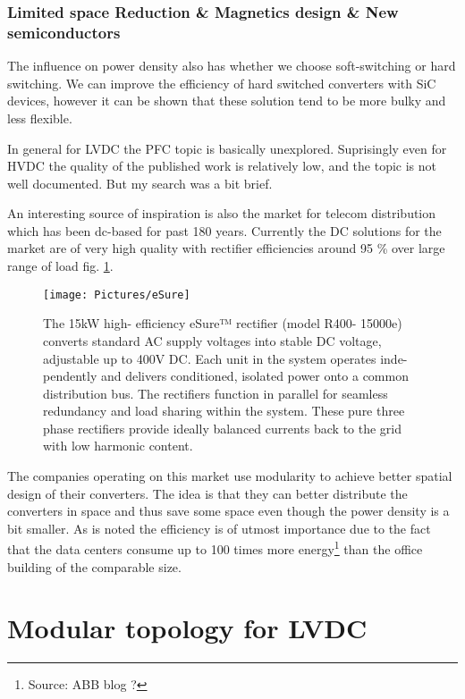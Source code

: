 \documentclass[]{scrartcl}
\begin{document}
\subsubsection{Limited space Reduction \& Magnetics design \& New semiconductors}

The influence on power density also has whether we choose soft-switching or hard switching. We can improve the efficiency of hard switched converters with SiC devices, however it can be shown that these solution tend to be more bulky and less flexible. 

In general for LVDC the PFC topic is basically unexplored. Suprisingly even for HVDC the quality of the published work is relatively low, and the topic is not well documented. But my search was a bit brief.  

An interesting source of inspiration is also the market for telecom distribution which has been dc-based for past 180 years. Currently the DC solutions for the market are of very high quality with rectifier efficiencies around 95 \% over large range of load fig. \ref{fig:eSure}.
\begin{figure}[h!]
	\centering
	\texttt{[image: Pictures/eSure]}
	\caption{The 15kW high- efficiency eSure™ rectifier (model R400- 15000e) converts standard AC supply voltages into stable DC voltage, adjustable up to 400V DC. Each unit in the system operates inde- pendently and delivers conditioned, isolated power onto a common distribution bus. The rectifiers function in parallel for seamless redundancy and load sharing within the system. These pure three phase rectifiers provide ideally balanced currents back to the grid with low harmonic content.}
	\label{fig:eSure}
\end{figure}
The companies operating on this market use modularity to achieve better spatial design of their converters. The idea is that they can better distribute the converters in space and thus save some space even though the power density is a bit smaller. As is noted the efficiency is of utmost importance due to the fact that the data centers consume up to 100 times more energy\footnote{Source: ABB blog ?} than the office building of the comparable size. 

\newpage
\section{Modular topology for LVDC}
\end{document}
